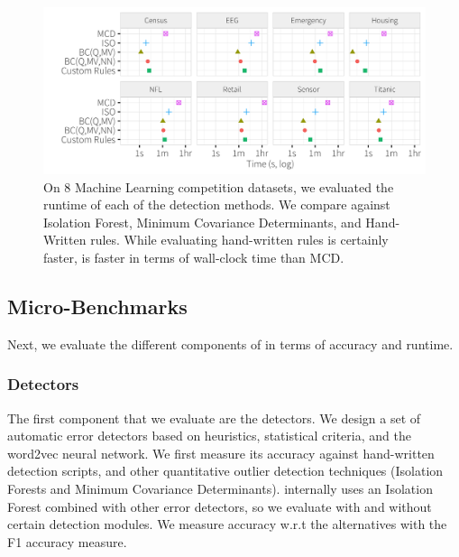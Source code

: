 \begin{figure}[t]
\centering
 \includegraphics[width=\columnwidth]{exp/druntime.png}
 \caption{On 8 Machine Learning competition datasets, we evaluated the runtime of each of the detection methods. We compare against Isolation Forest, Minimum Covariance Determinants, and Hand-Written rules. While evaluating hand-written rules is certainly faster, \sys is faster in terms of wall-clock time than MCD.
 \label{fig:druntime}}
\end{figure}

\subsection{Micro-Benchmarks}
Next, we evaluate the different components of \sys in terms of accuracy and runtime.

\subsubsection{Detectors}
The first component that we evaluate are the detectors. We design a set of automatic error detectors based on heuristics, statistical criteria, and the word2vec neural network. We first measure its accuracy against hand-written detection scripts, and other quantitative outlier detection techniques (Isolation Forests and Minimum Covariance Determinants).
\sys internally uses an Isolation Forest combined with other error detectors, so we evaluate \sys with and without certain detection modules.
We measure accuracy w.r.t the alternatives with the F1 accuracy measure.

